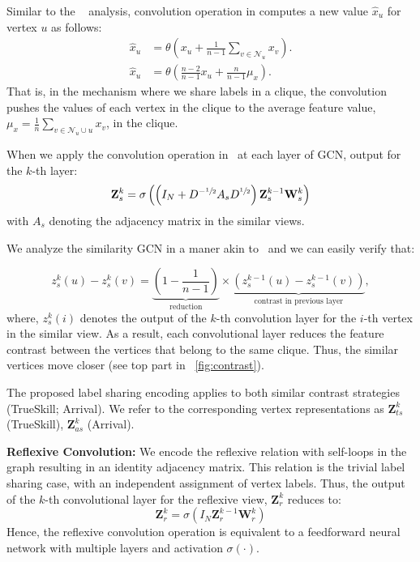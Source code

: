 Similar to the ~ analysis, convolution operation in  computes a new value $\hat{x}_u$ for vertex $u$ as follows:
\begin{align}
  \hat{x}_u &= \theta \left ( x_u + \frac{1}{n-1} \sum_{v \in \mathcal{N}_u} x_v \right ).\\
  \hat{x}_u &= \theta \left ( \frac{n-2}{n-1} x_u + \frac{n}{n-1} \mu_x \right ).
\end{align}
That is, in the mechanism where we share labels in a clique, the convolution pushes the values of each vertex in the clique to the average feature value, $\mu_x = \frac{1}{n} \sum_{v \in \mathcal{N}_u \cup u} x_v$, in the clique.

When we apply the convolution operation in~ at each layer of GCN, output for the $k$-th layer:
\begin{equation}
  \label{eq:similar}
  \mathbf{Z}_s^{k} = \sigma \left( \left (I_N + D^{-\sfrac{1}{2}}A_sD^{\sfrac{1}{2}} \right) \mathbf{Z}_s^{k-1} \mathbf{W}_s^{k}\right)
\end{equation}
with $A_s$ denoting the adjacency matrix in the similar views.

We analyze the similarity GCN in a maner akin to~ and we can easily verify that:

\begin{equation}
z_s^{k}(u) - z_s^{k}(v) = \underbrace{
  \left (1 - \frac{1}{n-1} \right )
  }_{\text{reduction}}
  \times
  \underbrace{
    \left ( z_s^{k-1}(u) - z_s^{k-1}(v) \right )
    }_{\text{contrast in previous layer}}, \label{eq:diffsimilar}
\end{equation}
where, $z_s^{k}(i)$ denotes the output of the $k$-th convolution layer for the $i$-th vertex in the similar view. As a result, each convolutional layer reduces the feature contrast between the vertices that belong to the same clique. Thus, the similar vertices move closer (see top part in ~\cref{fig:contrast}).

The proposed label sharing encoding applies to both similar contrast strategies (TrueSkill; Arrival). We refer to the corresponding vertex representations as $\mathbf{Z}_{ts}^{k}$ (TrueSkill), $\mathbf{Z}_{as}^{k}$ (Arrival).

\noindent
\textbf{Reflexive Convolution:}
\label{subsubsec:reflex}
We encode the reflexive relation with self-loops in the graph resulting in an identity adjacency matrix. This relation is the trivial label sharing case, with an independent assignment of vertex labels. Thus, the output of the $k$-th convolutional layer for the reflexive view, $\mathbf{Z}_r^{k}$ reduces to:
\begin{equation}
  \label{eq:reflexive}
  \mathbf{Z}_r^{k} = \sigma \left( I_N \mathbf{Z}_r^{k-1} \mathbf{W}_r^{k} \right)
\end{equation}
Hence, the reflexive convolution operation is equivalent to a feedforward neural network with multiple layers and activation $\sigma( \cdot )$.

